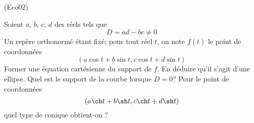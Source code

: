 \begin{tiny}(Eco02)\end{tiny} Soient $a$, $b$, $c$, $d$ des réels tels que
\begin{displaymath}
 D = ad - bc \neq 0
\end{displaymath}
 Un repère orthonormé étant fixé; pour tout réel $t$, on note $f(t)$ le point de coordonnées
\begin{displaymath}
 (a\cos t + b\sin t , c\cos t + d\sin t)
\end{displaymath}
Former une équation cartésienne du support de $f$. En déduire qu'il s'agit d'une ellipse. Quel est le support de la courbe lorsque $D=0$?\newline
Pour le point de coordonnées
\begin{displaymath}
 (a\ch t + b\sh t , c\ch t + d\sh t)
\end{displaymath}
quel type de conique obtient-on ?
